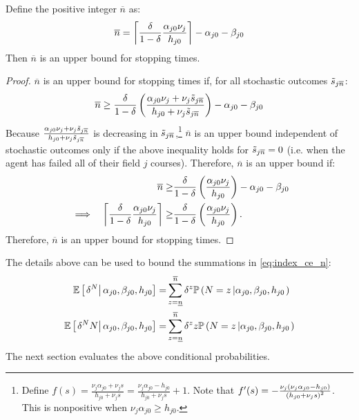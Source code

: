 \begin{lemma}
Define the positive integer $\overline{n}$ as:
\begin{equation}\label{eq:upper_n}
    \overline{n} = \ceil{\frac{\delta}{1 - \delta} \frac{\alpha_{j0} \nu_j}{h_{j0}}} - \alpha_{j0} - \beta_{j0}
\end{equation}
Then $\overline{n}$ is an upper bound for stopping times.
\end{lemma}

\begin{proof}

$\overline{n}$ is an upper bound for stopping times if, for all stochastic outcomes $\ks[\overline{n}]$:
\begin{equation*}
    \overline{n} \geq 
    \frac{\delta}{1 - \delta} 
    \pr{\frac{\alpha_{j0} \nu_j + \nu_j \ks[\overline{n}]}{h_{j0} + \nu_j \ks[\overline{n}]}} - \alpha_{j0} - \beta_{j0}
\end{equation*}
Because $\frac{\alpha_{j0} \nu_j + \nu_j \ks[\overline{n}]}{h_{j0} + \nu_j \ks[\overline{n}]}$ is decreasing in $\ks[\overline{n}]$,\footnote{
    Define $f(s) = \frac{\nu_j \alpha_{j0} + \nu_j s}{h_{j0} + \nu_j s} = \frac{\nu_j\alpha_{j0} - h_{j0}}{h_{j0} + \nu_j s} + 1$. 
    Note that $f'(s) = -\frac{\nu_j (\nu_j \alpha_{j0} - h_{j0})}{\pr{h_{j0} + \nu_j s}^2}$.
    This is nonpositive when $\nu_j \alpha_{j0} \geq h_{j0}$. 
}
$\overline{n}$ is an upper bound independent of stochastic outcomes only if the above inequality holds for $\ks[\overline{n}] = 0$ (i.e. when the agent has failed all of their field $j$ courses).
Therefore, $\overline{n}$ is an upper bound if:
\begin{alignat*}{3}
    &&
    \overline{n} 
    \geq& 
    \frac{\delta}{1 - \delta} 
    \pr{\frac{\alpha_{j0} \nu_j}{h_{j0}}} 
    - \alpha_{j0} - \beta_{j0}
    \\
    &\implies&
    \ceil{\frac{\delta}{1 - \delta} \frac{\alpha_{j0} \nu_j}{h_{j0}}}
    \geq&
     \frac{\delta}{1 - \delta} 
    \pr{\frac{\alpha_{j0} \nu_j}{h_{j0}}}.
\end{alignat*}
Therefore, $\overline{n}$ is an upper bound for stopping times.
\end{proof}








The details above can be used to bound the summations in \eqref{eq:index_ce_n}:
\begin{align*}
    \EE \ce{\delta^N}{\alpha_{j0}, \beta_{j0}, h_{j0}} 
    =&
    \sum_{z=\underline{n}}^{\overline{n}} 
    \delta^z
    \PP
    \pr{\crs{
        N = z
    }{\alpha_{j0}, \beta_{j0}, h_{j0}}}
    \\
    \EE \ce{\delta^N N}{\alpha_{j0}, \beta_{j0}, h_{j0}} 
    =&
    \sum_{z=\underline{n}}^{\overline{n}} 
    \delta^z z
    \PP
    \pr{\crs{
        N = z
    }{\alpha_{j0}, \beta_{j0}, h_{j0}}}
\end{align*}
The next section evaluates the above conditional probabilities.



